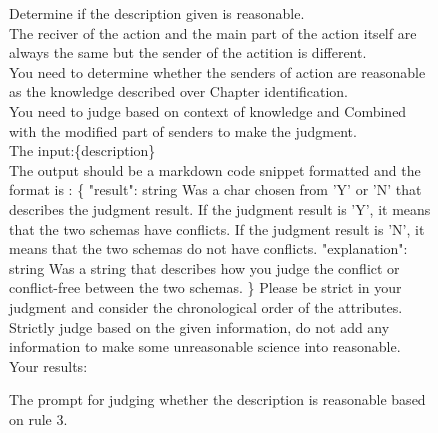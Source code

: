 \begin{figure}[htbp]
\centering
\begin{tcolorbox}
Determine if the description given is reasonable.
\\
The reciver of the action and the main part of the action itself are always the same but the sender of the actition is different.\\
You need to determine whether the senders of action are reasonable as the knowledge described over Chapter identification.\\
You need to judge based on context of knowledge and Combined with the modified part of senders to make the judgment.\\
The input:\{description\}\\
The output should be a markdown code snippet formatted and the format is : 
\{
        "result": string  Was a char chosen from 'Y' or 'N' that describes the judgment result. If the judgment result is 'Y', it means that the two schemas have conflicts. If the judgment result is 'N', it means that the two schemas do not have conflicts.
        "explanation": string Was a string that describes how you judge the conflict or conflict-free between the two schemas.
\}
Please be strict in your judgment and consider the chronological order of the attributes.\\
Strictly judge based on the given information, do not add any information to make some unreasonable science into reasonable.\\
Your results:\\
\end{tcolorbox}
\caption{The prompt for judging whether the description is reasonable based on rule 3.}
\label{tab:judge3}
\end{figure}



